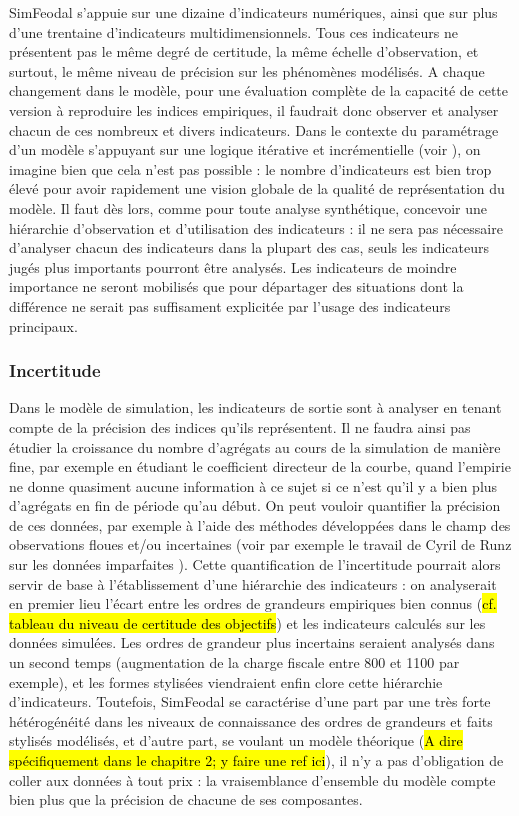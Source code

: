 SimFeodal s'appuie sur une dizaine d'indicateurs numériques, ainsi que sur plus d'une trentaine d'indicateurs multidimensionnels.
Tous ces indicateurs ne présentent pas le même degré de certitude, la même échelle d'observation, et surtout, le même niveau de précision sur les phénomènes modélisés.
A chaque changement dans le modèle, pour une évaluation complète de la capacité de cette version à reproduire les indices empiriques, il faudrait donc observer et analyser chacun de ces nombreux et divers indicateurs.
Dans le contexte du paramétrage d'un modèle s'appuyant sur une logique itérative et incrémentielle (voir ), on imagine bien que cela n'est pas possible :
le nombre d'indicateurs est bien trop élevé pour avoir rapidement une vision globale de la qualité de représentation du modèle.
Il faut dès lors, comme pour toute analyse synthétique, concevoir une hiérarchie d'observation et d'utilisation des indicateurs :
il ne sera pas nécessaire d'analyser chacun des indicateurs dans la plupart des cas, seuls les indicateurs jugés plus importants pourront être analysés.
Les indicateurs de moindre importance ne seront mobilisés que pour départager des situations dont la différence ne serait pas suffisament explicitée par l'usage des indicateurs principaux.

\subsubsection{Incertitude}\label{sssec:incertitude}
Dans le modèle de simulation, les indicateurs de sortie sont à analyser en tenant compte de la précision des indices qu'ils représentent.
Il ne faudra ainsi pas étudier la croissance du nombre d'agrégats au cours de la simulation de manière fine, par exemple en étudiant le coefficient directeur de la courbe, quand l'empirie ne donne quasiment aucune information à ce sujet si ce n'est qu'il y a bien plus d'agrégats en fin de période qu'au début.
On peut vouloir quantifier la précision de ces données, par exemple à l'aide des méthodes développées dans le champ des observations floues et/ou incertaines (voir par exemple le travail de Cyril de Runz sur les données \og imparfaites\fg{} \autocite{de2008imperfection}).
Cette quantification de l'incertitude pourrait alors servir de base à l'établissement d'une hiérarchie des indicateurs :
on analyserait en premier lieu l'écart entre les ordres de grandeurs empiriques bien connus (\hl{cf. tableau du niveau de certitude des objectifs}) et les indicateurs calculés sur les données simulées.
Les ordres de grandeur plus incertains seraient analysés dans un second temps (augmentation de la charge fiscale entre 800 et 1100 par exemple), et les formes stylisées viendraient enfin clore cette hiérarchie d'indicateurs.
Toutefois, SimFeodal se caractérise d'une part par une très forte hétérogénéité dans les niveaux de connaissance des ordres de grandeurs et faits stylisés modélisés, et d'autre part, se voulant un modèle théorique (\hl{A dire spécifiquement dans le chapitre 2; y faire une ref ici}), il n'y a pas d'obligation de \og coller aux données\fg{} à tout prix :
la vraisemblance d'ensemble du modèle compte bien plus que la précision de chacune de ses composantes.



